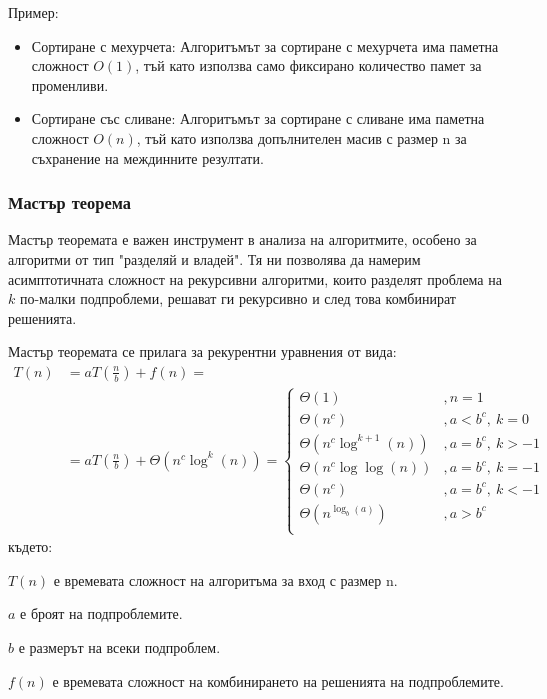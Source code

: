 \documentclass[oneside]{book}
\begin{document}
Пример:
\begin{itemize}
    \item[] Сортиране с мехурчета: Алгоритъмът за сортиране с мехурчета има паметна сложност $O(1)$, тъй като използва само фиксирано количество памет за променливи.
    \item[] Сортиране със сливане: Алгоритъмът за сортиране с сливане има паметна сложност $O(n)$, тъй като използва допълнителен масив с размер n за съхранение на междинните резултати.
\end{itemize}

\subsubsection{Мастър теорема}\label{sec:master-theorem}
Мастър теоремата е важен инструмент в анализа на алгоритмите, особено за алгоритми от тип "разделяй и владей". Тя ни позволява да намерим асимптотичната сложност на рекурсивни алгоритми, които разделят проблема на $k$ по-малки подпроблеми, решават ги рекурсивно и след това комбинират решенията.

Мастър теоремата се прилага за рекурентни уравнения от вида:
\begin{align*}
    T(n)&= aT\left(\frac{n}{b}\right) + f(n) =\\
        &= aT\left(\frac{n}{b}\right) + \Theta(n^c \log^k(n)) =
    \begin{cases}        
        \Theta(1)                   &, n=1\\
        \Theta(n^c)                 &, a<b^c,\ k=0\\
        \Theta(n^c \log^{k+1}(n))   &, a=b^c,\ k>-1\\
        \Theta(n^c \log\log(n))     &, a=b^c,\ k=-1\\
        \Theta(n^c)                 &, a=b^c,\ k<-1\\
        \Theta(n^{\log_b(a)})       &, a>b^c\\
    \end{cases}
\end{align*}
където:\vspace{8pt}

$T(n)$ е времевата сложност на алгоритъма за вход с размер n.

$a$ е броят на подпроблемите.

$b$ е размерът на всеки подпроблем.

$f(n)$ е времевата сложност на комбинирането на решенията на подпроблемите.
\end{document}

